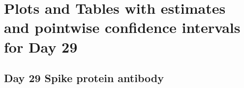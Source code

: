 \documentclass[]{book}
\theoremstyle{definition}
\theoremstyle{definition}
\theoremstyle{definition}
\newcommand{\1}{\mathbbm{1}}
\begin{document}
\clearpage

\clearpage

\hypertarget{plots-and-tables-with-estimates-and-pointwise-confidence-intervals-for-day-29}{%
\section{Plots and Tables with estimates and pointwise confidence intervals for Day 29}\label{plots-and-tables-with-estimates-and-pointwise-confidence-intervals-for-day-29}}

\clearpage

\hypertarget{day-29-spike-protein-antibody}{%
\subsection{Day 29 Spike protein antibody}\label{day-29-spike-protein-antibody}}
\end{document}
